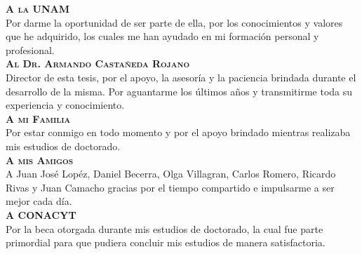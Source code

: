 \begin{agradecimientos}
  \textbf{\textsc{A la UNAM}}\\

  Por darme la oportunidad de ser parte de ella, por los conocimientos
  y valores que he adquirido, los cuales me han ayudado en mi
  formación personal y profesional.\\

  \textbf{\textsc{Al Dr. Armando Castañeda Rojano}}\\

  Director de esta tesis, por el apoyo, la asesoría y la paciencia
  brindada durante el desarrollo de la misma. Por aguantarme los
  últimos años y transmitirme toda su experiencia y conocimiento.\\

  \textbf{\textsc{A mi Familia}}\\

  Por estar conmigo en todo momento y por el apoyo brindado mientras
  realizaba mis estudios de doctorado.\\

  \textbf{\textsc{A mis Amigos}}\\

  A Juan José Lopéz, Daniel Becerra, Olga Villagran, Carlos Romero,
  Ricardo Rivas y Juan Camacho gracias por el tiempo compartido e
  impulsarme a ser mejor cada día.\\

  \textbf{\textsc{A CONACYT}}\\

  Por la beca otorgada durante mis estudios de doctorado, la cual fue
  parte primordial para que pudiera concluir mis estudios de manera
  satisfactoria.\\

\end{agradecimientos}